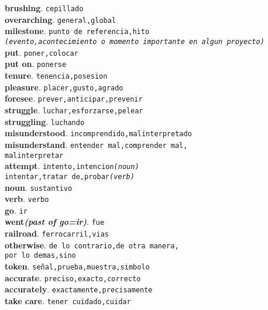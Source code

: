 \documentclass[twocolumn]{article}
\begin{document}
	\textsf{\textbf{brushing}}. \texttt{cepillado}\\
	\textsf{\textbf{overarching}}. \texttt{general,global}\\
	\textsf{\textbf{milestone}}. \texttt{punto de referencia,hito\\{\scriptsize \textsl{(evento,acontecimiento o momento importante en algun proyecto)}}}\\
	\textsf{\textbf{put}}. \texttt{poner,colocar}\\
	\textsf{\textbf{put on}}. \texttt{ponerse}\\
	\textsf{\textbf{tenure}}. \texttt{tenencia,posesion}\\
	\textsf{\textbf{pleasure}}. \texttt{placer,gusto,agrado}\\
	\textsf{\textbf{foresee}}. \texttt{prever,anticipar,prevenir}\\
	\textsf{\textbf{struggle}}. \texttt{luchar,esforzarse,pelear}\\
	\textsf{\textbf{struggling}}. \texttt{luchando}\\
	\textsf{\textbf{misunderstood}}. \texttt{incomprendido,malinterpretado}\\
	\textsf{\textbf{misunderstand}}. \texttt{entender mal,comprender mal,\\malinterpretar}\\
	\textsf{\textbf{attempt}}. \texttt{intento,intencion{\scriptsize \textsl{(noun)}}\\intentar,tratar de,probar{\scriptsize \textsl{(verb)}}}\\
	\textsf{\textbf{noun}}. \texttt{sustantivo}\\
	\textsf{\textbf{verb}}. \texttt{verbo}\\
	\textsf{\textbf{go}}. \texttt{ir}\\
	\textsf{\textbf{went{\scriptsize \textsl{(past of go=ir)}}}}. \texttt{fue}\\
	\textsf{\textbf{railroad}}. \texttt{ferrocarril,vias}\\
	\textsf{\textbf{otherwise}}. \texttt{de lo contrario,de otra manera,\\por lo demas,sino}\\
	\textsf{\textbf{token}}. \texttt{se\~nal,prueba,muestra,simbolo}\\
	\textsf{\textbf{accurate}}. \texttt{preciso,exacto,correcto}\\
	\textsf{\textbf{accurately}}. \texttt{exactamente,precisamente}\\
	\textsf{\textbf{take care}}. \texttt{tener cuidado,cuidar}\\
\end{document}
